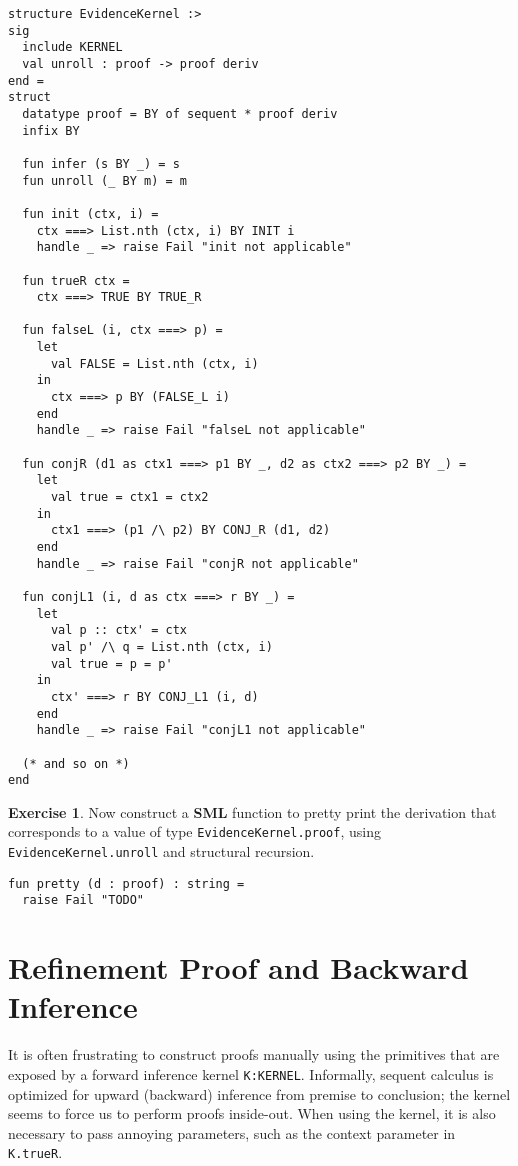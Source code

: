 \documentclass{article}
\newcommand\FormatLang[1]{{\bfseries\sffamily #1}}
\newcommand\SML{\FormatLang{SML}}
\theoremstyle{definition}
\newtheorem{exercise}{Exercise}[section]
\theoremstyle{remark}
\begin{document}
\begin{verbatim}
structure EvidenceKernel :>
sig
  include KERNEL
  val unroll : proof -> proof deriv
end =
struct
  datatype proof = BY of sequent * proof deriv
  infix BY

  fun infer (s BY _) = s
  fun unroll (_ BY m) = m

  fun init (ctx, i) =
    ctx ===> List.nth (ctx, i) BY INIT i
    handle _ => raise Fail "init not applicable"

  fun trueR ctx =
    ctx ===> TRUE BY TRUE_R

  fun falseL (i, ctx ===> p) =
    let
      val FALSE = List.nth (ctx, i)
    in
      ctx ===> p BY (FALSE_L i)
    end
    handle _ => raise Fail "falseL not applicable"

  fun conjR (d1 as ctx1 ===> p1 BY _, d2 as ctx2 ===> p2 BY _) =
    let
      val true = ctx1 = ctx2
    in
      ctx1 ===> (p1 /\ p2) BY CONJ_R (d1, d2)
    end
    handle _ => raise Fail "conjR not applicable"

  fun conjL1 (i, d as ctx ===> r BY _) =
    let
      val p :: ctx' = ctx
      val p' /\ q = List.nth (ctx, i)
      val true = p = p'
    in
      ctx' ===> r BY CONJ_L1 (i, d)
    end
    handle _ => raise Fail "conjL1 not applicable"

  (* and so on *)
end
\end{verbatim}

\begin{exercise}
  Now construct a \SML{} function to pretty print the derivation that
  corresponds to a value of type \verb|EvidenceKernel.proof|, using
  \verb|EvidenceKernel.unroll| and structural recursion.
\begin{verbatim}
fun pretty (d : proof) : string =
  raise Fail "TODO"
\end{verbatim}
\end{exercise}


\section{Refinement Proof and Backward Inference}

It is often frustrating to construct proofs manually using the
primitives that are exposed by a forward inference kernel
\verb|K:KERNEL|. Informally, sequent calculus is optimized for upward
(backward) inference from premise to conclusion; the kernel seems to
force us to perform proofs inside-out. When using the kernel, it is
also necessary to pass annoying parameters, such as the context
parameter in \verb|K.trueR|.
\end{document}
